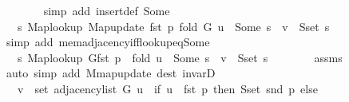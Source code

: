 \begin{isabellebody}
\ \ \ \ \ \ \isamarkupfalse%
\ {\isacharparenleft}{\kern0pt}simp\ add{\isacharcolon}{\kern0pt}\ insert{\isacharunderscore}{\kern0pt}{}{\isacharunderscore}{\kern0pt}def\ Some{\isacharparenright}{\kern0pt}\isanewline
\ \ \ \ \isamarkupfalse%
\ \isamarkupfalse%
\ {\isachardoublequoteopen}{\isachardot}{\kern0pt}{\isachardot}{\kern0pt}{\isachardot}{\kern0pt}\ {\isasymlongleftrightarrow}\ {\isacharparenleft}{\kern0pt}{\isasymexists}s{\isachardot}{\kern0pt}\ Map{\isacharunderscore}{\kern0pt}lookup\ {\isacharparenleft}{\kern0pt}Map{\isacharunderscore}{\kern0pt}update\ {\isacharparenleft}{\kern0pt}fst\ p{\isacharparenright}{\kern0pt}\ {\isacharquery}{\kern0pt}fold\ G{\isacharparenright}{\kern0pt}\ u\ {\isacharequal}{\kern0pt}\ Some\ s\ {\isasymand}\ v\ {\isasymin}\ S{\isachardot}{\kern0pt}set\ s{\isacharparenright}{\kern0pt}{\isachardoublequoteclose}\isanewline
\ \ \ \ \ \ \isamarkupfalse%
\ {\isacharparenleft}{\kern0pt}simp\ add{\isacharcolon}{\kern0pt}\ mem{\isacharunderscore}{\kern0pt}adjacency{\isacharunderscore}{\kern0pt}iff{\isacharunderscore}{\kern0pt}lookup{\isacharunderscore}{\kern0pt}eq{\isacharunderscore}{\kern0pt}Some{\isacharparenright}{\kern0pt}\isanewline
\ \ \ \ \isamarkupfalse%
\ \isamarkupfalse%
\ {\isachardoublequoteopen}{\isachardot}{\kern0pt}{\isachardot}{\kern0pt}{\isachardot}{\kern0pt}\ {\isasymlongleftrightarrow}\ {\isacharparenleft}{\kern0pt}{\isasymexists}s{\isachardot}{\kern0pt}\ {\isacharparenleft}{\kern0pt}Map{\isacharunderscore}{\kern0pt}lookup\ G{\isacharparenleft}{\kern0pt}fst\ p\ {\isasymmapsto}\ {\isacharquery}{\kern0pt}fold{\isacharparenright}{\kern0pt}{\isacharparenright}{\kern0pt}\ u\ {\isacharequal}{\kern0pt}\ Some\ s\ {\isasymand}\ v\ {\isasymin}\ S{\isachardot}{\kern0pt}set\ s{\isacharparenright}{\kern0pt}{\isachardoublequoteclose}\isanewline
\ \ \ \ \ \ \isamarkupfalse%
\ assms{\isacharparenleft}{\kern0pt}{}{\isacharparenright}{\kern0pt}\isanewline
\ \ \ \ \ \ \isamarkupfalse%
\ {\isacharparenleft}{\kern0pt}auto\ simp\ add{\isacharcolon}{\kern0pt}\ M{\isachardot}{\kern0pt}map{\isacharunderscore}{\kern0pt}update\ dest{\isacharcolon}{\kern0pt}\ invarD{\isacharparenleft}{\kern0pt}{}{\isacharparenright}{\kern0pt}{\isacharparenright}{\kern0pt}\isanewline
\ \ \ \ \isamarkupfalse%
\ \isamarkupfalse%
\ {\isachardoublequoteopen}{\isachardot}{\kern0pt}{\isachardot}{\kern0pt}{\isachardot}{\kern0pt}\ {\isasymlongleftrightarrow}\ v\ {\isasymin}\ set\ {\isacharparenleft}{\kern0pt}adjacency{\isacharunderscore}{\kern0pt}list\ G\ u{\isacharparenright}{\kern0pt}\ {\isasymunion}\ {\isacharparenleft}{\kern0pt}if\ u\ {\isacharequal}{\kern0pt}\ fst\ p\ then\ S{\isachardot}{\kern0pt}set\ {\isacharparenleft}{\kern0pt}snd\ p{\isacharparenright}{\kern0pt}\ else\ {\isacharbraceleft}{\kern0pt}{\isacharbraceright}{\kern0pt}{\isacharparenright}{\kern0pt}{\isachardoublequoteclose}\isanewline

\end{isabellebody}
